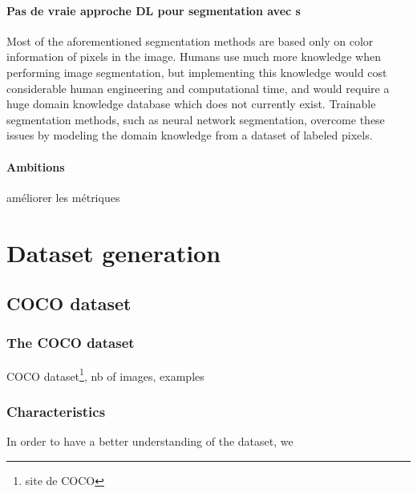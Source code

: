 \documentclass{article}
\begin{document}
                \paragraph{Pas de vraie approche DL pour segmentation avec \spp s} Most of the aforementioned segmentation methods are based only on color information of pixels in the image. Humans use much more knowledge when performing image segmentation, but implementing this knowledge would cost considerable human engineering and computational time, and would require a huge domain knowledge database which does not currently exist. Trainable segmentation methods, such as neural network segmentation, overcome these issues by modeling the domain knowledge from a dataset of labeled pixels.
                \paragraph{Ambitions}
                améliorer les métriques









\section{Dataset generation}
    \subsection{COCO dataset}
        \subsubsection{The COCO dataset}
        COCO dataset\footnote{site de COCO}, nb of images, examples

        \subsubsection{Characteristics}
        \label{par:charac}
        In order to have a better understanding of the dataset, we
\end{document}
